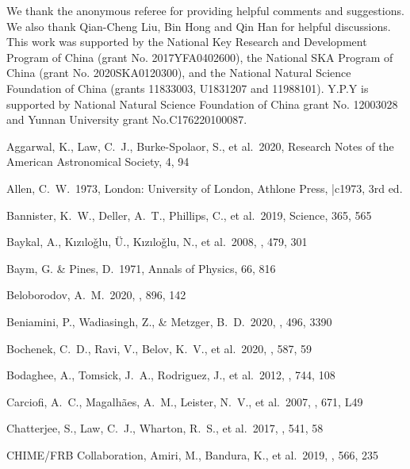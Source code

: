 \documentclass[twocolumn]{aastex62}
\begin{document}
\acknowledgements
We thank the anonymous referee for providing helpful comments and suggestions. 
We also thank Qian-Cheng Liu, Bin Hong and Qin Han for helpful discussions. This work was supported by the National Key Research and Development Program of China (grant No. 2017YFA0402600), the National SKA Program of China (grant No. 2020SKA0120300), and the National Natural Science Foundation of China (grants 11833003, U1831207 and 11988101). Y.P.Y is supported by National Natural Science Foundation of China grant No. 12003028 and Yunnan University grant No.C176220100087.

\begin{thebibliography}

 Aggarwal, K., Law, C.~J., Burke-Spolaor, S., et al.\ 2020, Research Notes of the American Astronomical Society, 4, 94

 Allen, C.~W.\ 1973, London: University of London, Athlone Press, |c1973, 3rd ed.

 Bannister, K.~W., Deller, A.~T., Phillips, C., et al.\ 2019, Science, 365, 565

 Baykal, A., K{\i}z{\i}lo{\v{g}}lu, {\"U}., K{\i}z{\i}lo{\v{g}}lu, N., et al.\ 2008, \aap, 479, 301

 Baym, G. \& Pines, D.\ 1971, Annals of Physics, 66, 816

 Beloborodov, A.~M.\ 2020, \apj, 896, 142

 Beniamini, P., Wadiasingh, Z., \& Metzger, B.~D.\ 2020, \mnras, 496, 3390

 Bochenek, C.~D., Ravi, V., Belov, K.~V., et al.\ 2020, \nat, 587, 59

 Bodaghee, A., Tomsick, J.~A., Rodriguez, J., et al.\ 2012, \apj, 744, 108

 Carciofi, A.~C., Magalh{\~a}es, A.~M., Leister, N.~V., et al.\ 2007, \apjl, 671, L49

 Chatterjee, S., Law, C.~J., Wharton, R.~S., et al.\ 2017, \nat, 541, 58

 CHIME/FRB Collaboration, Amiri, M., Bandura, K., et al.\ 2019, \nat, 566, 235


\end{thebibliography}
\end{document}
